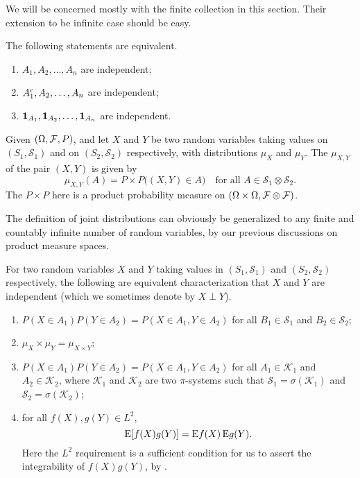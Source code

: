 We will be concerned mostly with the finite collection in this section. Their extension to be infinite case should be easy.

\begin{prop}
    The following statements are equivalent.
    \begin{enumerate}
        \item $A_1,A_2,\dotsc,A_n$ are independent;
        \item $A_1^{\mathrm{c}},A_2,\dotsc,A_n$ are independent;
        \item $\mathbf{1}_{A_1},\mathbf{1}_{A_2},\dotsc,\mathbf{1}_{A_n}$ are independent.
    \end{enumerate}
\end{prop}

Given $(\Omega,\mathcal{F},P)$, and let $X$ and $Y$ be two random variables taking values on $(S_1,\mathcal S_1)$ and on $(S_2,\mathcal S_2)$ respectively, with distributions $\mu_X$ and $\mu_Y$. The  $\mu_{X,Y}$ of the pair $(X,Y)$ is given by \[
    \mu_{X,Y}(A) = P\times P\bigl((X,Y) \in A\bigr)\quad\text{for all }A\in \mathcal{S}_1\otimes\mathcal{S}_2.
\] The $P\times P$ here is a product probability measure on $(\Omega\times \Omega, \mathcal{F}\otimes \mathcal{F})$.

The definition of joint distributions can obviously be generalized to any finite and countably infinite number of random variables, by our previous discussions on product measure spaces.

\begin{thm} \label{thm:indep-char}
    For two random variables $X$ and $Y$ taking values in $(S_1,\mathcal S_1)$ and $(S_2,\mathcal S_2)$ respectively, the following are equivalent characterization that $X$ and $Y$ are independent (which we sometimes denote by $X \perp Y$).
    \begin{enumerate}
        \item $P(X\in A_1)P(Y \in A_2) = P(X \in A_1, Y\in A_2)$ for all $B_1\in \mathcal S_1$ and $B_2\in \mathcal S_2$;
        \item \label{enu:indep-prod-meas} $\mu_X \times \mu_Y = \mu_{X \times Y}$;
        \item $P(X\in A_1)P(Y \in A_2) = P(X \in A_1, Y\in A_2)$ for all $A_1\in \mathcal K_1$ and $A_2\in \mathcal K_2$, where $\mathcal K_1$ and $\mathcal K_2$ are two $\pi$-systems such that $\mathcal S_1 = \sigma(\mathcal K_1)$ and $\mathcal S_2 = \sigma(\mathcal K_2)$;
        \item \label{enu:indep-check-via-L2} for all $f(X), g(Y) \in L^2$, \[
            \mathop{}\!\mathrm{E}[f(X)g(Y)] = \mathop{}\!\mathrm{E} f(X)\mathop{}\!\mathrm{E} g(Y).
        \] Here the $L^2$ requirement is a sufficient condition for us to assert the integrability of $f(X)g(Y)$, by .
    \end{enumerate}
\end{thm}

